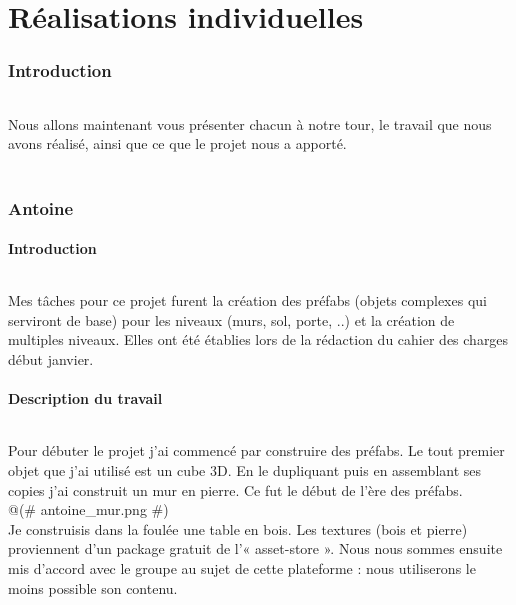\documentclass[titlepage, 13px, a4paper]{report}
\begin{document}

\newpage


\part{Réalisations individuelles}
\section*{Introduction}
\paragraph{} \hspace{0pt}
Nous allons maintenant vous présenter chacun à notre tour, le travail que nous avons réalisé, 
ainsi que ce que le projet nous a apporté. \\ \\

\section{Antoine}
\subsection{Introduction}
\paragraph{} \hspace{0pt} 
Mes tâches pour ce projet furent la création des préfabs (objets complexes qui
serviront de base) pour les niveaux (murs, sol, porte, ..) et la création de multiples
niveaux. Elles ont été établies lors de la rédaction du cahier des charges début janvier. \\

\subsection{Description du travail}

\paragraph{} \hspace{0pt} 
Pour débuter le projet j'ai commencé par construire des préfabs. Le tout premier
objet que j'ai utilisé est un cube 3D. En le dupliquant puis en assemblant ses
copies j'ai construit un mur en pierre. Ce fut le début de l'ère des préfabs. \\@(\# antoine\_mur.png \#)\@  \\
Je construisis dans la foulée une table en bois. Les textures (bois et pierre)
proviennent d'un package gratuit de l'« asset-store ». Nous nous sommes ensuite
mis d'accord avec le groupe au sujet de cette plateforme : nous utiliserons le
moins possible son contenu. \\
\end{document}
